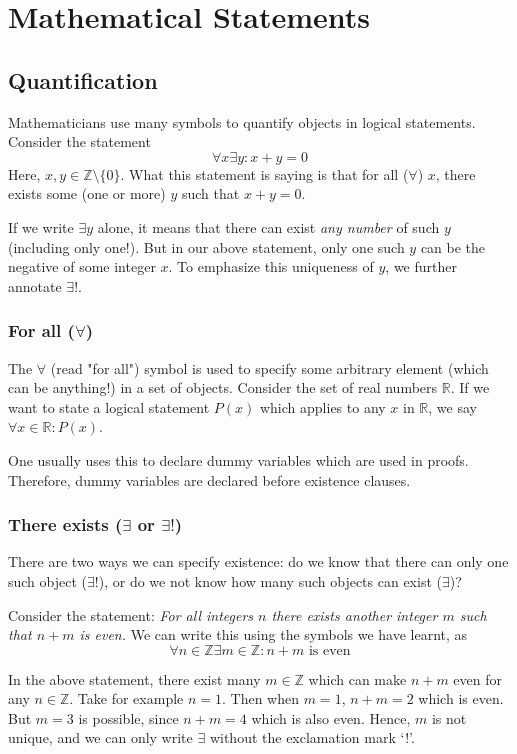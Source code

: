 \chapter{Mathematical Statements}
\section{Quantification}
Mathematicians use many symbols to quantify objects in logical statements. Consider the statement
\[
\forall x \exists y : x + y = 0
\]
Here, $x,y \in \mathbb{Z} \setminus \{0\}$. What this statement is saying is that for all ($\forall$) $x$, there exists
some (one or more) $y$ such that $x + y = 0$.

If we write $\exists y$ alone, it means that there can exist \textit{any number} of such $y$ (including only one!).
But in our above statement, only one such $y$ can be the negative of some integer $x$. To emphasize this uniqueness
of $y$, we further annotate $\exists!$.

\subsection{For all ($\forall$)}
The $\forall$ (read "for all") symbol is used to specify some arbitrary element (which can be anything!) in a set
of objects. Consider the set of real numbers $\mathbb{R}$. If we want to state a logical statement $P(x)$ which
applies to any $x$ in $\mathbb{R}$, we say $\forall x \in \mathbb{R} : P(x)$.

One usually uses this to declare dummy variables which are used in proofs. Therefore, dummy variables
are declared before existence clauses.

\subsection{There exists ($\exists$ or $\exists!$)}
There are two ways we can specify existence: do we know that there can only one such object ($\exists!$),
or do we not know how many such objects can exist ($\exists$)?

Consider the statement: \textit{For all integers $n$ there exists another integer $m$ such that $n + m$ is even.}
We can write this using the symbols we have learnt, as
\[
\forall n \in \mathbb{Z} \exists m \in \mathbb {Z} : n + m \,\, \text{is even}
\]

In the above statement, there exist many $m \in \mathbb{Z}$ which can make $n + m$ even for any $n \in \mathbb{Z}$.
Take for example $n = 1$. Then when $m = 1$, $n + m = 2$ which is even. But $m = 3$ is possible, since $n + m = 4$
which is also even. Hence, $m$ is not unique, and we can only write $\exists$ without the exclamation mark `!'.

